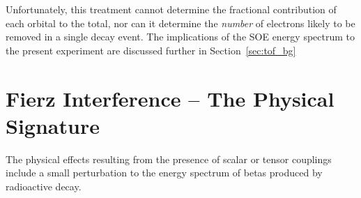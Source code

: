 Unfortunately, this treatment cannot determine the fractional contribution of each orbital to the total, nor can it determine the \emph{number} of electrons likely to be removed in a single decay event.  The implications of the SOE energy spectrum to the present experiment are discussed further in Section~\ref{sec:tof_bg} 







\FloatBarrier  %
\section{Fierz Interference -- The Physical Signature}
\label{signature_chapter}
	The physical effects resulting from the presence of scalar or tensor couplings include a small perturbation to the energy spectrum of betas produced by radioactive decay.  




